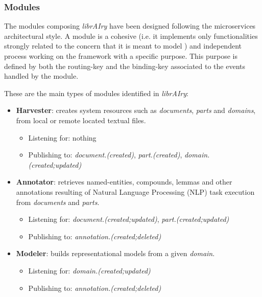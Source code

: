 \subsubsection{Modules}
The modules composing \textit{librAIry} have been designed following the microservices architectural style. A module is a cohesive (i.e. it implements only functionalities strongly related to the concern that it is meant to model \cite{Dragoni2016}) and independent process working on the framework with a specific purpose. This purpose is defined by both the routing-key and the binding-key associated to the events handled by the module. 

These are the main types of modules identified in \textit{librAIry}:
\begin{itemize}
	\item \textbf{Harvester}: creates system resources such as \textit{documents}, \textit{parts} and \textit{domains}, from local or remote located textual files.
    \begin{itemize}[rightmargin=\dimexpr\linewidth-5cm-\leftmargin\relax]
    	\item Listening for: nothing
		\item Publishing to: \textit{document.(created)}, 
        \textit{part.(created)}, \textit{domain.(created;updated)}
    \end{itemize}
    \item \textbf{Annotator}: retrieves named-entities, compounds, lemmas and other annotations resulting of Natural Language Processing (NLP) task execution from \textit{documents} and \textit{parts}.
    \begin{itemize}[rightmargin=\dimexpr\linewidth-5cm-\leftmargin\relax]
    	\item Listening for: \textit{document.(created;updated)}, \textit{part.(created;updated)}
		\item Publishing to: \textit{annotation.(created;deleted)}
    \end{itemize}
    \item \textbf{Modeler}: builds representational models from a given \textit{domain}. 
    \begin{itemize}[rightmargin=\dimexpr\linewidth-5cm-\leftmargin\relax]
    	\item Listening for: \textit{domain.(created;updated)}
		\item Publishing to: \textit{annotation.(created;deleted)}
    \end{itemize}
\end{itemize}

